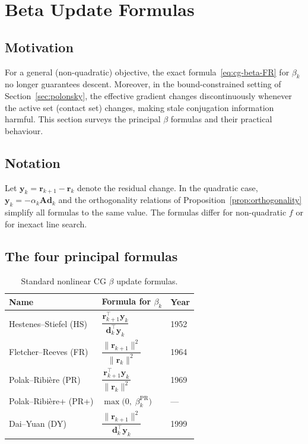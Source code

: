 \documentclass[11pt,a4paper]{article}
\newcommand{\bA}{\mathbf{A}}
\newcommand{\br}{\mathbf{r}}
\newcommand{\bd}{\mathbf{d}}
\newcommand{\by}{\mathbf{y}}
\newcommand{\norm}[1]{\|#1\|}
\newcommand{\tr}{\top}
\begin{document}
\section{Beta Update Formulas}
\label{sec:beta}

\subsection{Motivation}

For a general (non-quadratic) objective, the exact formula~\eqref{eq:cg-beta-FR}
for $\beta_k$ no longer guarantees descent.  Moreover, in the bound-constrained
setting of Section~\ref{sec:polonsky}, the effective gradient changes discontinuously
whenever the active set (contact set) changes, making stale conjugation information
harmful.  This section surveys the principal $\beta$ formulas and their practical behaviour.

\subsection{Notation}

Let $\by_k = \br_{k+1} - \br_k$ denote the residual change.  In the quadratic case,
$\by_k = -\alpha_k\bA\bd_k$ and the orthogonality relations of
Proposition~\ref{prop:orthogonality} simplify all formulas to the same value.
The formulas differ for non-quadratic $f$ or for inexact line search.

\subsection{The four principal formulas}

\begin{table}[ht]
\centering
\caption{Standard nonlinear CG $\beta$ update formulas.}
\label{tab:beta}
\begin{tabular}{@{}lll@{}}
\toprule
Name & Formula for $\beta_k$ & Year \\
\midrule
Hestenes--Stiefel (HS)  & $\dfrac{\br_{k+1}^\tr \by_k}{\bd_k^\tr \by_k}$ & 1952 \\[8pt]
Fletcher--Reeves (FR)   & $\dfrac{\norm{\br_{k+1}}^2}{\norm{\br_k}^2}$ & 1964 \\[8pt]
Polak--Ribi\`ere (PR)   & $\dfrac{\br_{k+1}^\tr \by_k}{\norm{\br_k}^2}$ & 1969 \\[8pt]
Polak--Ribi\`ere+ (PR+) & $\max\!\bigl(0,\;\beta_k^{\mathrm{PR}}\bigr)$ & --- \\[8pt]
Dai--Yuan (DY)          & $\dfrac{\norm{\br_{k+1}}^2}{\bd_k^\tr \by_k}$ & 1999 \\
\bottomrule
\end{tabular}
\end{table}
\end{document}
